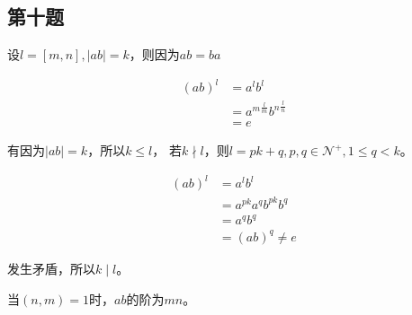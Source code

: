 \documentclass[12pt,onecolumn]{article}
\theoremstyle{plain}
\newcommand{\theSet}[1]{\mathcal{#1}}
\begin{document}
\subsection{第十题}
\begin{proof*}
  设$l = [m, n], |ab| = k$，则因为$ab = ba$

  \begin{align*}
    {(ab)}^l &= a^l b^l \\
             &= {a^m}^{\frac{l}{m}}{b^n}^{\frac{l}{n}} \\
             &= e
  \end{align*}

  有因为$|ab| = k$，所以$k \leq l$，
  若$k \nmid l$，则$l = pk + q, p, q \in \theSet{N^{+}}, 1 \leq q < k$。

  \begin{align*}
    {(ab)}^l &= a^l b^l \\
             &= a^{pk} a^q b^{pk} b^{q} \\
             &= a^q b^q \\
             &= {(ab)}^q \neq e
  \end{align*}

  发生矛盾，所以$k \mid l$。
\end{proof*}

当$(n, m) = 1$时，$ab$的阶为$mn$。
\end{document}
